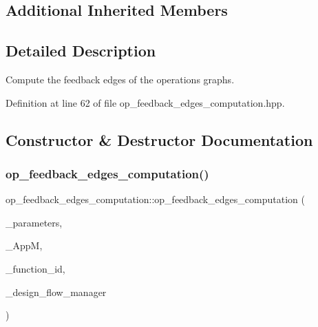 \subsection*{Additional Inherited Members}


\subsection{Detailed Description}
Compute the feedback edges of the operations graphs. 

Definition at line 62 of file op\+\_\+feedback\+\_\+edges\+\_\+computation.\+hpp.



\subsection{Constructor \& Destructor Documentation}
\mbox{\label{classop__feedback__edges__computation_a72e8d5d9bb051b0f439168bad95abe33}} 
\subsubsection{\texorpdfstring{op\+\_\+feedback\+\_\+edges\+\_\+computation()}{op\_feedback\_edges\_computation()}}
{\footnotesize\ttfamily op\+\_\+feedback\+\_\+edges\+\_\+computation\+::op\+\_\+feedback\+\_\+edges\+\_\+computation (\begin{DoxyParamCaption}\item[{const \hyperlink{Parameter_8hpp_a37841774a6fcb479b597fdf8955eb4ea}{Parameter\+Const\+Ref}}]{\+\_\+parameters,  }\item[{const \hyperlink{application__manager_8hpp_a04ccad4e5ee401e8934306672082c180}{application\+\_\+manager\+Ref}}]{\+\_\+\+AppM,  }\item[{unsigned int}]{\+\_\+function\+\_\+id,  }\item[{const Design\+Flow\+Manager\+Const\+Ref}]{\+\_\+design\+\_\+flow\+\_\+manager }\end{DoxyParamCaption})}



